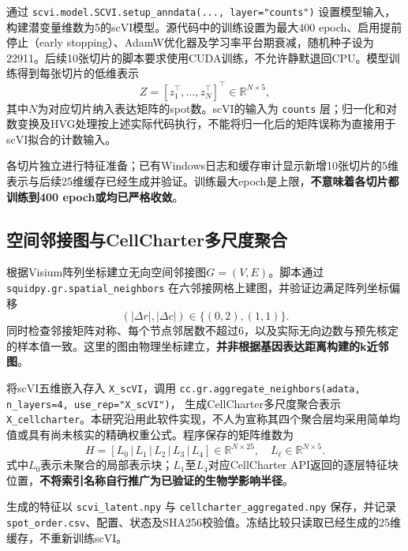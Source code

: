 \documentclass[UTF8,a4paper,12pt]{ctexart}
\begin{document}
通过 \texttt{scvi.model.SCVI.setup\_anndata(..., layer="counts")} 设置模型输入，构建潜变量维数为5的scVI模型。源代码中的训练设置为最大400 epoch、启用提前停止（early stopping）、AdamW优化器及学习率平台期衰减，随机种子设为22911。后续10张切片的脚本要求使用CUDA训练，不允许静默退回CPU。模型训练得到每张切片的低维表示
\begin{equation}
  Z = \left[z_1^\top,\ldots,z_N^\top\right]^\top
      \in\mathbb{R}^{N\times 5},
\end{equation}
其中$N$为对应切片纳入表达矩阵的spot数。scVI的输入为 \texttt{counts} 层；归一化和对数变换及HVG处理按上述实际代码执行，不能将归一化后的矩阵误称为直接用于scVI拟合的计数输入。

各切片独立进行特征准备；已有Windows日志和缓存审计显示新增10张切片的5维表示与后续25维缓存已经生成并验证。训练最大epoch是上限，\textbf{不意味着各切片都训练到400 epoch或均已严格收敛}。

\subsection{空间邻接图与CellCharter多尺度聚合}
\label{subsec:aggregate}
根据Visium阵列坐标建立无向空间邻接图$G=(V,E)$。脚本通过 \texttt{squidpy.gr.spatial\_neighbors} 在六邻接网格上建图，并验证边满足阵列坐标偏移
\begin{equation}
  (|\Delta r|,|\Delta c|)\in\{(0,2),(1,1)\}.
  \label{eq:hex}
\end{equation}
同时检查邻接矩阵对称、每个节点邻居数不超过6，以及实际无向边数与预先核定的样本值一致。这里的图由物理坐标建立，\textbf{并非根据基因表达距离构建的k近邻图}。

将scVI五维嵌入存入 \texttt{X\_scVI}，调用
\texttt{cc.gr.aggregate\_neighbors(adata, n\_layers=4, use\_rep="X\_scVI")}，
生成CellCharter多尺度聚合表示 \texttt{X\_cellcharter}。本研究沿用此软件实现，不人为宣称其四个聚合层均采用简单均值或具有尚未核实的精确权重公式。程序保存的矩阵维数为
\begin{equation}
  H=[L_0\,|\,L_1\,|\,L_2\,|\,L_3\,|\,L_4]
    \in\mathbb{R}^{N\times25},
  \quad L_{\ell}\in\mathbb{R}^{N\times5}.
  \label{eq:multi}
\end{equation}
式中$L_0$表示未聚合的局部表示块；$L_1$至$L_4$对应CellCharter API返回的逐层特征块位置，\textbf{不将索引名称自行推广为已验证的生物学影响半径}。

生成的特征以 \texttt{scvi\_latent.npy} 与 \texttt{cellcharter\_aggregated.npy} 保存，并记录 \texttt{spot\_order.csv}、配置、状态及SHA256校验值。冻结比较只读取已经生成的25维缓存，不重新训练scVI。
\end{document}
